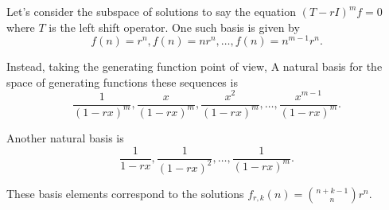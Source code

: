 Let's consider the subspace of solutions to say the equation $(T - rI)^mf = 0$ where $T$ is the left shift operator. One such basis is given by 
\[f(n) = r^n, f(n) = nr^n, \dots, f(n) = n^{m-1}r^n.\]

Instead, taking the generating function point of view, A natural basis for the space of generating functions these sequences is
\[\frac{1}{(1-rx)^m}, \frac{x}{(1-rx)^m}, \frac{x^2}{(1-rx)^m}, \dots, \frac{x^{m-1}}{(1-rx)^m}.\]

Another natural basis is
\[\frac{1}{1-rx}, \frac{1}{(1-rx)^2}, \dots, \frac{1}{(1-rx)^m}.\]

These basis elements correspond to the solutions $f_{r,k}(n) = \binom{n + k - 1}{n}r^n$.

